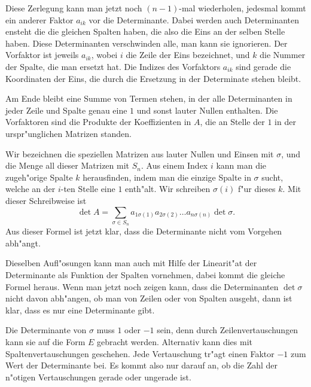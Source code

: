 Diese Zerlegung kann man jetzt noch $(n-1)$-mal wiederholen,
jedesmal kommt ein anderer Faktor $a_{ik}$ vor die Determinante.
Dabei werden auch Determinanten ensteht die die gleichen Spalten
haben, die also die Eins an der selben Stelle haben. Diese Determinanten
verschwinden alle, man kann sie ignorieren. Der Vorfaktor ist
jeweils $a_{ik}$, wobei $i$ die Zeile der Eins bezeichnet, und $k$
die Nummer der Spalte, die man ersetzt hat. Die Indizes des
Vorfaktors $a_{ik}$ sind gerade die Koordinaten der Eins, die durch
die Ersetzung in der Determinate stehen bleibt.

Am Ende bleibt eine Summe von Termen stehen, in der alle Determinanten
in jeder Zeile und Spalte genau eine $1$ und sonst lauter Nullen
enthalten. Die Vorfaktoren sind die Produkte der Koeffizienten in $A$,
die an Stelle der $1$ in der urspr"unglichen Matrizen standen.

Wir bezeichnen die speziellen Matrizen aus lauter Nullen und Einsen
mit $\sigma$, und die Menge all dieser Matrizen mit $S_n$. Aus einem
Index $i$ kann man die zugeh"orige Spalte $k$ herausfinden, indem
man die einzige Spalte in $\sigma$ sucht, welche an der $i$-ten
Stelle eine $1$ enth"alt. Wir schreiben $\sigma(i)$ f"ur dieses $k$.
Mit dieser Schreibweise ist 
\[
\det A=\sum_{\sigma\in S_n}
a_{1\sigma(1)}
a_{2\sigma(2)}
\dots
a_{n\sigma(n)}
\det \sigma.
\]
Aus dieser Formel ist jetzt klar, dass die Determinante nicht vom
Vorgehen abh"angt.

Dieselben Aufl"osungen kann man auch mit Hilfe der Linearit"at der
Determinante als Funktion der Spalten vornehmen, dabei kommt die 
gleiche Formel heraus. Wenn man jetzt noch zeigen kann, dass
die Determinanten $\det\sigma$ nicht davon abh"angen, ob man von
Zeilen oder von Spalten ausgeht, dann ist klar, dass es nur eine
Determinante gibt.

Die Determinante von $\sigma$ muss $1$ oder $-1$ sein, denn durch
Zeilenvertauschungen kann sie auf die Form $E$ gebracht werden.
Alternativ kann dies mit Spaltenvertauschungen geschehen. Jede
Vertauschung tr"agt einen Faktor $-1$ zum Wert der Determinante
bei. Es kommt also nur darauf an, ob die Zahl der n"otigen
Vertauschungen gerade oder ungerade ist.

